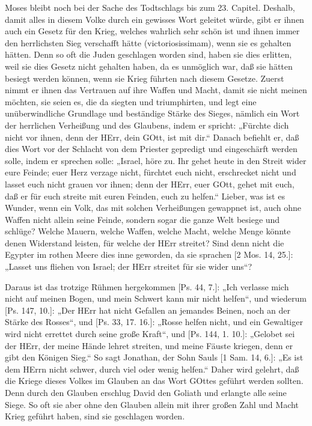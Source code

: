 Moses bleibt noch bei der Sache des Todtschlags bis zum 23. Capitel. Deshalb, damit alles in diesem Volke durch ein gewisses Wort geleitet würde, gibt er ihnen auch ein Gesetz für den Krieg, welches wahrlich sehr schön ist und ihnen immer den herrlichsten Sieg verschafft hätte (victoriosissimam), wenn sie es gehalten hätten. Denn so oft die Juden geschlagen worden sind, haben sie dies erlitten, weil sie dies Gesetz nicht gehalten haben, da es unmöglich war, daß sie hätten besiegt werden können, wenn sie Krieg führten nach diesem Gesetze. Zuerst nimmt er ihnen das Vertrauen auf ihre Waffen und Macht, damit sie nicht meinen möchten, sie seien es, die da siegten und triumphirten, und legt eine unüberwindliche Grundlage und beständige Stärke des Sieges, nämlich ein Wort der herrlichen Verheißung und des Glaubens, indem er spricht: „Fürchte dich nicht vor ihnen, denn der HErr, dein GOtt, ist mit dir.“ Danach befiehlt er, daß dies Wort vor der Schlacht von dem Priester gepredigt und eingeschärft werden solle, indem er sprechen solle: „Israel, höre zu. Ihr gehet heute in den Streit wider eure Feinde; euer Herz verzage nicht, fürchtet euch nicht, erschrecket nicht und lasset euch nicht grauen vor ihnen; denn der HErr, euer GOtt, gehet mit euch, daß er für euch streite mit euren Feinden, euch zu helfen.“ Lieber, was ist es Wunder, wenn ein Volk, das mit solchen Verheißungen gewappnet ist, auch ohne Waffen nicht allein seine Feinde, sondern sogar die ganze Welt besiege und schlüge? Welche Mauern, welche Waffen, welche Macht, welche Menge könnte denen Widerstand leisten, für welche der HErr streitet? Sind denn nicht die Egypter im rothen Meere dies inne geworden, da sie sprachen [2 Mos. 14, 25.]: „Lasset uns fliehen von Israel; der HErr streitet für sie wider uns“?

Daraus ist das trotzige Rühmen hergekommen [Ps. 44, 7.]: „Ich verlasse mich nicht auf meinen Bogen, und mein Schwert kann mir nicht helfen“, und wiederum [Ps. 147, 10.]: „Der HErr hat nicht Gefallen an jemandes Beinen, noch an der Stärke des Rosses“, und [Ps. 33, 17. 16.]: „Rosse helfen nicht, und ein Gewaltiger wird nicht errettet durch seine große Kraft“, und [Ps. 144, 1. 10.]: „Gelobet sei der HErr, der meine Hände lehret streiten, und meine Fäuste kriegen, denn er gibt den Königen Sieg.“ So sagt Jonathan, der Sohn Sauls [1 Sam. 14, 6.]: „Es ist dem HErrn nicht schwer, durch viel oder wenig helfen.“ Daher wird gelehrt, daß die Kriege dieses Volkes im Glauben an das Wort GOttes geführt werden sollten. Denn durch den Glauben erschlug David den Goliath und erlangte alle seine Siege. So oft sie aber ohne den Glauben allein mit ihrer großen Zahl und Macht Krieg geführt haben, sind sie geschlagen worden.

